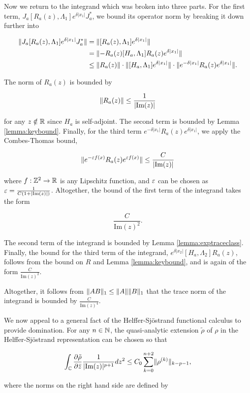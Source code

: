 \documentclass[12pt, letterpaper]{article}
\begin{document}
Now we return to the integrand which was broken into three parts. For the first term, $J_a[R_a(z),\Lambda_1]e^{\delta|x_1|}J_a^*$, we bound its operator norm by breaking it down further into

\[\begin{aligned}
\|J_a[R_a(z),\Lambda_1]e^{\delta|x_1|}J_a^*\| &= \|[R_a(z),\Lambda_1]e^{\delta|x_1|}\| \\
&=\lVert -R_a(z)[H_a,\Lambda_1]R_a(z)e^{\delta|x_1|} \rVert\\
&\leq \lVert R_a(z) \rVert\cdot \lVert [H_a,\Lambda_1]e^{\delta|x_1|} \rVert\cdot \lVert e^{-\delta|x_1|}R_a(z)e^{\delta|x_1|} \rVert.
\end{aligned}\]

The norm of $R_a(z)$ is bounded by 

\[\lVert R_a(z) \rVert \leq \frac{1}{|\text{Im}(z)|}\]

for any $z\notin \mathbb{R}$ since $H_a$ is self-adjoint. The second term is bounded by Lemma \ref{lemma:keybound}. Finally, for the third term $e^{-\delta|x_1|}R_a(z)e^{\delta|x_1|}$, we apply the Combes-Thomas bound,

\[\lVert e^{-\varepsilon f(x)}R_a(z)e^{\varepsilon f(x)} \rVert \leq \frac{C}{|\text{Im}(z)|}\]

where $f:\mathbb{Z}^2\to\mathbb{R}$ is any Lipschitz function, and $\varepsilon$ can be chosen as $\varepsilon = \frac{1}{C(1+|\text{Im}(z)|)}$. Altogether, the bound of the first term of the integrand takes the form 

\[\frac{C}{\text{Im}(z)^2}.\]

The second term of the integrand is bounded by Lemma \ref{lemma:exptraceclass}. Finally, the bound for the third term of the integrand, $e^{\delta|x_2|} [H_a,\Lambda_2] R_a(z)$, follows from the bound on $R$ and Lemma \ref{lemma:keybound}, and is again of the form $\frac{C}{\text{Im}(z)^2}$.

Altogether, it follows from $\lVert AB \rVert_1 \leq \lVert A \rVert\lVert B \rVert_1$ that the trace norm of the integrand is bounded by $\frac{C}{\text{Im}(z)^4}$. 

We now appeal to a general fact of the Helffer-Sj\"{o}strand functional calculus to provide domination. For any $n\in \mathbb{N}$, the quasi-analytic extension $\tilde{\rho}$ of $\rho$ in the Helffer-Sj\"{o}strand representation can be chosen so that 

\[\int_{\mathbb{C}}\frac{\partial \tilde{\rho}}{\partial \bar{z}} \frac{1}{|\text{Im}(z)|^{p+1}}dz^2 \leq C_0 \sum_{k=0}^{n+2 }\lVert \rho^{(k)} \rVert_{k-p-1},\]

where the norms on the right hand side are defined by 
\end{document}
